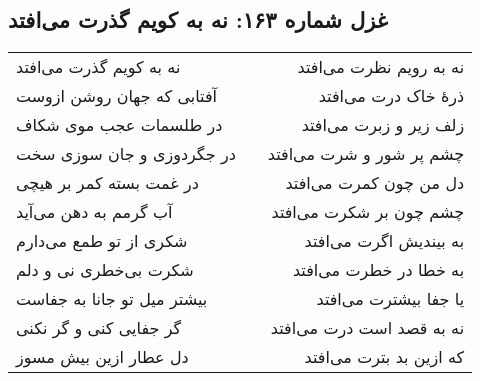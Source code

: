 \begin{center}
\section*{غزل شماره ۱۶۳: نه به کویم گذرت می‌افتد}
\label{sec:163}
\begin{longtable}{l p{0.5cm} r}
نه به کویم گذرت می‌افتد
&&
نه به رویم نظرت می‌افتد
\\
آفتابی که جهان روشن ازوست
&&
ذرهٔ خاک درت می‌افتد
\\
در طلسمات عجب موی شکاف
&&
زلف زیر و زبرت می‌افتد
\\
در جگردوزی و جان سوزی سخت
&&
چشم پر شور و شرت می‌افتد
\\
در غمت بسته کمر بر هیچی
&&
دل من چون کمرت می‌افتد
\\
آب گرمم به دهن می‌آید
&&
چشم چون بر شکرت می‌افتد
\\
شکری از تو طمع می‌دارم
&&
به بیندیش اگرت می‌افتد
\\
شکرت بی‌خطری نی و دلم
&&
به خطا در خطرت می‌افتد
\\
بیشتر میل تو جانا به جفاست
&&
یا جفا بیشترت می‌افتد
\\
گر جفایی کنی و گر نکنی
&&
نه به قصد است درت می‌افتد
\\
دل عطار ازین بیش مسوز
&&
که ازین بد بترت می‌افتد
\\
\end{longtable}
\end{center}
